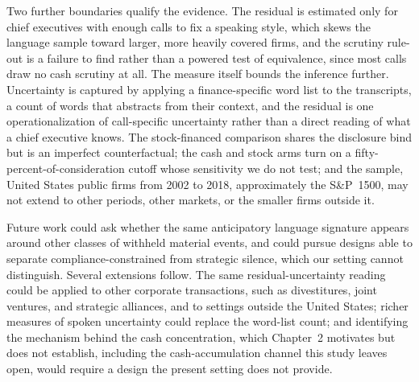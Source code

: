 Two further boundaries qualify the evidence. The residual is estimated only for chief executives with enough calls to fix a speaking style, which skews the language sample toward larger, more heavily covered firms, and the scrutiny rule-out is a failure to find rather than a powered test of equivalence, since most calls draw no cash scrutiny at all. The measure itself bounds the inference further. Uncertainty is captured by applying a finance-specific word list to the transcripts, a count of words that abstracts from their context, and the residual is one operationalization of call-specific uncertainty rather than a direct reading of what a chief executive knows. The stock-financed comparison shares the disclosure bind but is an imperfect counterfactual; the cash and stock arms turn on a fifty-percent-of-consideration cutoff whose sensitivity we do not test; and the sample, United States public firms from 2002 to 2018, approximately the S\&P~1500, may not extend to other periods, other markets, or the smaller firms outside it.

Future work could ask whether the same anticipatory language signature appears around other classes of withheld material events, and could pursue designs able to separate compliance-constrained from strategic silence, which our setting cannot distinguish. Several extensions follow. The same residual-uncertainty reading could be applied to other corporate transactions, such as divestitures, joint ventures, and strategic alliances, and to settings outside the United States; richer measures of spoken uncertainty could replace the word-list count; and identifying the mechanism behind the cash concentration, which Chapter~2 motivates but does not establish, including the cash-accumulation channel this study leaves open, would require a design the present setting does not provide.

